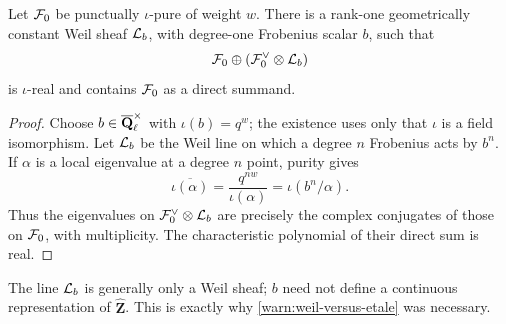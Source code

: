 \begin{lemma}
\label{lem:real-envelope}
Let \(\mathcal F_0\) be punctually \(\iota\)-pure of weight \(w\).  There is a
rank-one geometrically constant Weil sheaf \(\mathcal L_b\), with degree-one
Frobenius scalar \(b\), such that
\[
  \mathcal F_0\oplus(\mathcal F_0^\vee\otimes\mathcal L_b)
\]
is \(\iota\)-real and contains \(\mathcal F_0\) as a direct summand.
\end{lemma}

\begin{proof}
Choose \(b\in\overline{\mathbf Q}_\ell^\times\) with
\(\iota(b)=q^w\); the existence uses only that \(\iota\) is a field
isomorphism.  Let \(\mathcal L_b\) be the Weil line on which a degree \(n\)
Frobenius acts by \(b^n\).  If \(\alpha\) is a local eigenvalue at a
degree \(n\) point, purity gives
\[
 \overline{\iota(\alpha)}
 =\frac{q^{nw}}{\iota(\alpha)}
 =\iota(b^n/\alpha).
\]
Thus the eigenvalues on \(\mathcal F_0^\vee\otimes\mathcal L_b\) are precisely the
complex conjugates of those on \(\mathcal F_0\), with multiplicity.  The
characteristic polynomial of their direct sum is real.
\end{proof}

\begin{warning}
The line \(\mathcal L_b\) is generally only a Weil sheaf; \(b\) need not define a
continuous representation of \(\widehat{\mathbf Z}\).  This is exactly
why \cref{warn:weil-versus-etale} was necessary.
\end{warning}

